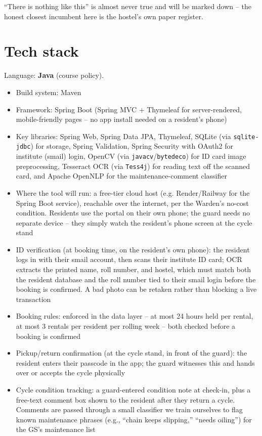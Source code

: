 \documentclass[11pt]{article}
\begin{document}
``There is nothing like this'' is almost never true and will be marked down -- the honest closest incumbent here is the hostel's own paper register.

\section{Tech stack}
Language: \textbf{Java} (course policy).
\begin{itemize}[leftmargin=*]
  \item Build system: Maven
  \item Framework: Spring Boot (Spring MVC + Thymeleaf for server-rendered, mobile-friendly pages -- no app install needed on a resident's phone)
  \item Key libraries: Spring Web, Spring Data JPA, Thymeleaf, SQLite (via \texttt{sqlite-jdbc}) for storage, Spring Validation, Spring Security with OAuth2 for institute (smail) login, OpenCV (via \texttt{javacv}/\texttt{bytedeco}) for ID card image preprocessing, Tesseract OCR (via \texttt{Tess4j}) for reading text off the scanned card, and Apache OpenNLP for the maintenance-comment classifier
  \item Where the tool will run: a free-tier cloud host (e.g. Render/Railway for the Spring Boot service), reachable over the internet, per the Warden's no-cost condition. Residents use the portal on their own phone; the guard needs no separate device -- they simply watch the resident's phone screen at the cycle stand
  \item ID verification (at booking time, on the resident's own phone): the resident logs in with their smail account, then scans their institute ID card; OCR extracts the printed name, roll number, and hostel, which must match both the resident database and the roll number tied to their smail login before the booking is confirmed. A bad photo can be retaken rather than blocking a live transaction
  \item Booking rules: enforced in the data layer -- at most 24 hours held per rental, at most 3 rentals per resident per rolling week -- both checked before a booking is confirmed
  \item Pickup/return confirmation (at the cycle stand, in front of the guard): the resident enters their passcode in the app; the guard witnesses this and hands over or accepts the cycle physically
  \item Cycle condition tracking: a guard-entered condition note at check-in, plus a free-text comment box shown to the resident after they return a cycle. Comments are passed through a small classifier we train ourselves to flag known maintenance phrases (e.g., ``chain keeps slipping,'' ``needs oiling'') for the GS's maintenance list
\end{itemize}
\end{document}
